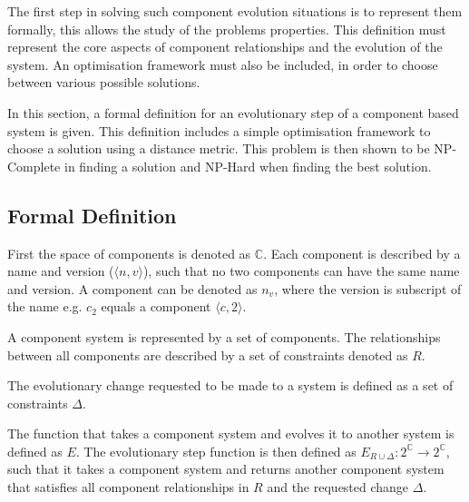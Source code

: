 The first step in solving such component evolution situations is to represent them formally, this allows the study of the problems properties.
This definition must represent the core aspects of component relationships and the evolution of the system.
An optimisation framework must also be included, in order to choose between various possible solutions.

In this section, a formal definition for an evolutionary step of a component based system is given.
This definition includes a simple optimisation framework to choose a solution using a distance metric.
This problem is then shown to be NP-Complete in finding a solution and NP-Hard when finding the best solution.

\subsection{Formal Definition}
First the space of components is denoted as $\mathbb{C}$.
Each component is described by a name and version ($\langle n, v\rangle$), such that no two components can have the same name and version.
A component can be denoted as $n_v$, where the version is subscript of the name e.g. $c_2$ equals a component $\langle c, 2\rangle$.

A component system is represented by a set of components.
The relationships between all components are described by a set of constraints denoted as $R$.

The evolutionary change requested to be made to a system is defined as a set of constraints $\Delta$.

The function that takes a component system and evolves it to another system is defined as $E$.
The evolutionary step function is then defined as $E_{R \cup \Delta}: 2^\mathbb{C} \rightarrow 2^\mathbb{C}$, 
such that it takes a component system and returns another component system that satisfies all component relationships in $R$ and the requested change $\Delta$.

